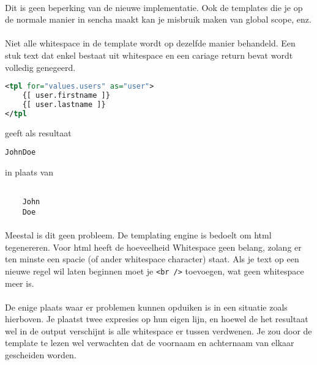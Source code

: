 \paragraph {} Dit is geen beperking van de nieuwe implementatie. Ook de templates die je
op de normale manier in sencha maakt kan je misbruik maken van global scope, enz.

\paragraph {} Niet alle whitespace in de template wordt op dezelfde manier behandeld. Een
stuk text dat enkel bestaat uit whitespace en een cariage return bevat wordt volledig
genegeerd.

\begin{lstlisting}[language=xml]
<tpl for="values.users" as="user">
	{[ user.firstname ]}
	{[ user.lastname ]}
</tpl
\end{lstlisting}

geeft als resultaat

\begin{lstlisting}
JohnDoe
\end{lstlisting}

in plaats van 

\begin{lstlisting}

	John
	Doe

\end{lstlisting}

\paragraph {} Meestal is dit geen probleem. De templating engine is bedoelt om html
tegenereren. Voor html heeft de hoeveelheid Whitespace geen belang, zolang er ten minste
een spacie (of ander whitespace character) staat. Als je text op een nieuwe regel wil
laten beginnen moet je \lstinline{<br />} toevoegen, wat geen whitespace meer is.

\paragraph {} De enige plaats waar er problemen kunnen opduiken is in een situatie zoals
hierboven. Je plaatst twee expresies op hun eigen lijn, en hoewel de het resultaat wel in
de output verschijnt is alle whitespace er tussen verdwenen. Je zou door de template te
lezen wel verwachten dat de voornaam en achternaam van elkaar gescheiden worden.

